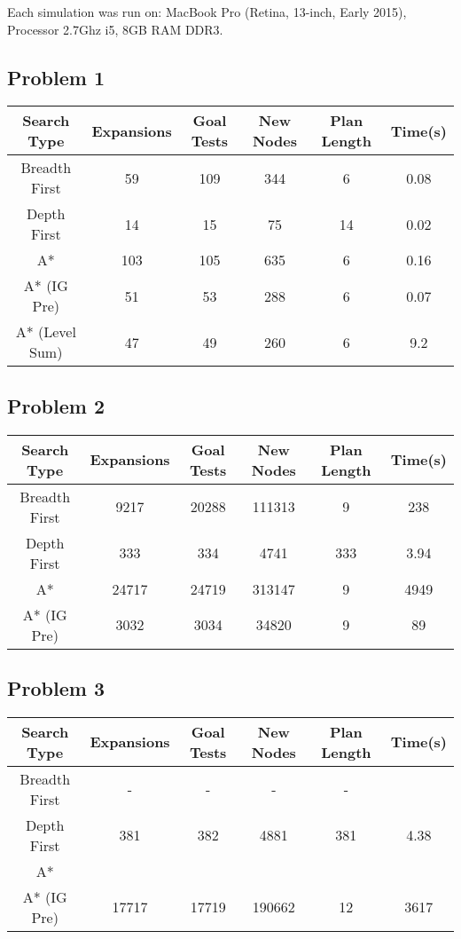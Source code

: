 \documentclass[paper=letter, fontsize=12pt]{article}
\begin{document}
Each simulation was run on:
MacBook Pro (Retina, 13-inch, Early 2015), Processor 2.7Ghz i5, 8GB RAM DDR3.

\subsection{Problem 1}
\begin{center}
\begin{tabular}{ |c|c|c|c|c|c| }
 \hline
 Search Type & Expansions & Goal Tests & New Nodes & Plan Length & Time(s) \\
 \hline
 Breadth First & 59 & 109 & 344 & 6 & 0.08 \\
 Depth First & 14 & 15 & 75 & 14 & 0.02 \\
 A* & 103 & 105 & 635 & 6 & 0.16 \\
 A* (IG Pre) & 51 & 53 & 288 & 6 & 0.07 \\
 A* (Level Sum) & 47 & 49 & 260 & 6 & 9.2 \\
 \hline
\end{tabular}
\end{center}

\subsection{Problem 2}
\begin{center}
\begin{tabular}{ |c|c|c|c|c|c| }
 \hline
 Search Type & Expansions & Goal Tests & New Nodes & Plan Length & Time(s) \\
 \hline
 Breadth First & 9217 & 20288 & 111313 & 9 & 238 \\
 Depth First & 333 & 334 & 4741 & 333 & 3.94 \\
 A* & 24717 & 24719 & 313147 & 9 & 4949 \\
 A* (IG Pre) & 3032 & 3034 & 34820 & 9 & 89 \\
 \hline
\end{tabular}
\end{center}


\subsection{Problem 3}
\begin{center}
\begin{tabular}{ |c|c|c|c|c|c| }
 \hline
 Search Type & Expansions & Goal Tests & New Nodes & Plan Length & Time(s) \\
 \hline
 Breadth First & - & - & - &  -&  \\
 Depth First & 381 & 382 & 4881 & 381 & 4.38 \\
 A* &  &  &  &  &  \\
 A* (IG Pre) & 17717 & 17719 & 190662 & 12 & 3617 \\
 \hline
\end{tabular}
\end{center}
\end{document}
